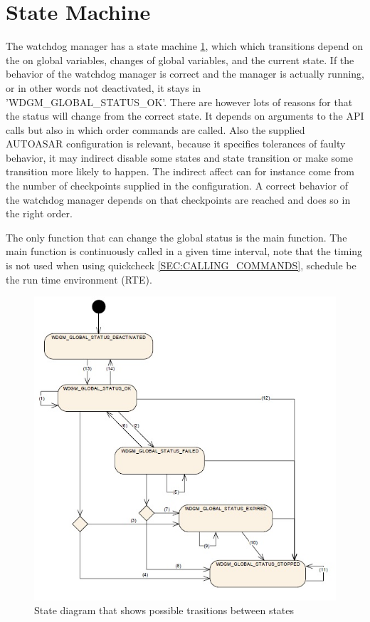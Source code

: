 
\section{State Machine}
The watchdog manager has a state machine \ref{FIG:GLOBALSTATUSES},
which which transitions depend on the on global variables, changes of global
variables, and the current state. If the behavior of the watchdog manager is
correct and the manager is actually running, or in other words not deactivated,
it stays in 'WDGM\_GLOBAL\_STATUS\_OK'. There are however lots of reasons for
that the status will change from the correct state. It depends on arguments to
the API calls but also in which order commands are called. Also the supplied
AUTOASAR configuration is relevant, because it specifies tolerances of faulty
behavior, it may indirect disable some states and state transition or make some
transition more likely to happen. The indirect affect can for instance come from
the number of checkpoints supplied in the configuration. A correct behavior of
the watchdog manager depends on that checkpoints are reached and does so in the
right order.

The only function that can change the global status is the main function. The
main function is continuously called in a given time interval, note that the
timing is not used when using quickcheck \ref{SEC:CALLING_COMMANDS}, schedule be
the run time environment (RTE).


\begin{figure}[h!]
\label{FIG:GLOBALSTATUSES}
\caption{State diagram that shows possible trasitions between states}
\begin{center}
\includegraphics{pictures/globalstatuses.jpg}
\end{center}
\end{figure}



